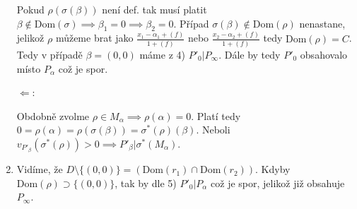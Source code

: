 \documentclass[12pt, a4paper]{article}
\begin{document}
\begin{enumerate}
    Pokud $\rho(\sigma(\beta))$ není def. tak musí platit $\beta \notin \text{Dom}(\sigma) \implies \beta_1 = 0 \implies \beta_2 = 0$. Případ $\sigma(\beta) \notin \text{Dom}(\rho)$ nenastane, jelikož $\rho$ můžeme brat jako $\frac{x_1-\alpha_1+(f)}{1+(f)}$ nebo $\frac{x_2-\alpha_2+(f)}{1+(f)}$ tedy $\text{Dom}(\rho)=C$. Tedy v případě $\beta=(0,0)$ máme z 4) $P'_0 | P_\infty$. Dále by tedy $P'_0$ obsahovalo místo $P_\alpha$ což je spor.

    $\Leftarrow$:

    Obdobně zvolme $\rho \in M_\alpha \implies \rho(\alpha) = 0$. Platí tedy $0 = \rho(\alpha) = \rho(\sigma(\beta)) = \sigma^*(\rho)(\beta)$. Neboli $v_{P'_\beta}(\sigma^*(\rho)) > 0 \implies P'_\beta | \sigma^*(M_\alpha)$.

    \item Vidíme, že $D \setminus \{(0,0)\} = (\text{Dom}(r_1) \cap \text{Dom}(r_2))$. Kdyby $\text{Dom}(\rho) \supset \{(0,0)\}$, tak by dle 5) $P'_0|P_\alpha$ což je spor, jelikož již obsahuje $P_\infty$.
\end{enumerate}
\end{document}
